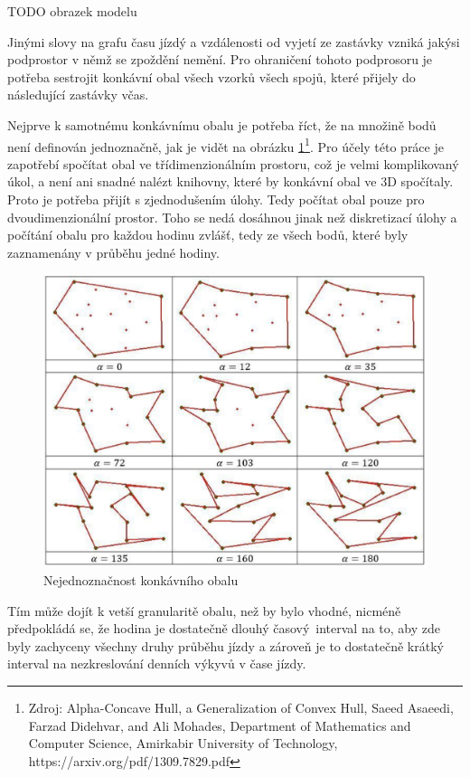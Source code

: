 \bigbreak

TODO obrazek modelu

\bigbreak

Jinými slovy na grafu času jízdý a vzdálenosti od vyjetí ze zastávky vzniká jakýsi podprostor v němž se zpoždění nemění. Pro ohraničení tohoto podprosoru je potřeba sestrojit konkávní obal všech vzorků všech spojů, které přijely do následující zastávky včas.

\bigbreak

Nejprve k samotnému konkávnímu obalu je potřeba říct, že na množině bodů není definován jednoznačně, jak je vidět na obrázku \ref{fig:konkavni_obal_nejednoznacny}\footnote{Zdroj: Alpha-Concave Hull, a Generalization of Convex Hull, Saeed Asaeedi, Farzad Didehvar, and Ali Mohades, Department of Mathematics and Computer Science, Amirkabir University of Technology, https://arxiv.org/pdf/1309.7829.pdf}. Pro účely této práce je zapotřebí spočítat obal ve třídimenzionálním prostoru, což je velmi komplikovaný úkol, a není ani snadné nalézt knihovny, které by konkávní obal ve 3D spočítaly. Proto je potřeba přijít s zjednodušením úlohy. Tedy počítat obal pouze pro dvoudimenzionální prostor. Toho se nedá dosáhnou jinak než diskretizací úlohy a počítání obalu pro každou hodinu zvlášť, tedy ze všech bodů, které byly zaznamenány v průběhu jedné hodiny.

\begin{figure}
	\centering
  \includegraphics[width=0.8\linewidth]{../img/konkavni_obal_nejednoznacny.png}
  \caption{Nejednoznačnost konkávního obalu}
  \label{fig:konkavni_obal_nejednoznacny}
\end{figure}

\bigbreak

 Tím může dojít k vetší granularitě obalu, než by bylo vhodné, nicméně předpokládá se, že hodina je dostatečně dlouhý časový interval na to, aby zde byly zachyceny všechny druhy průběhu jízdy a zároveň je to dostatečně krátký interval na nezkreslování denních výkyvů v čase jízdy.

